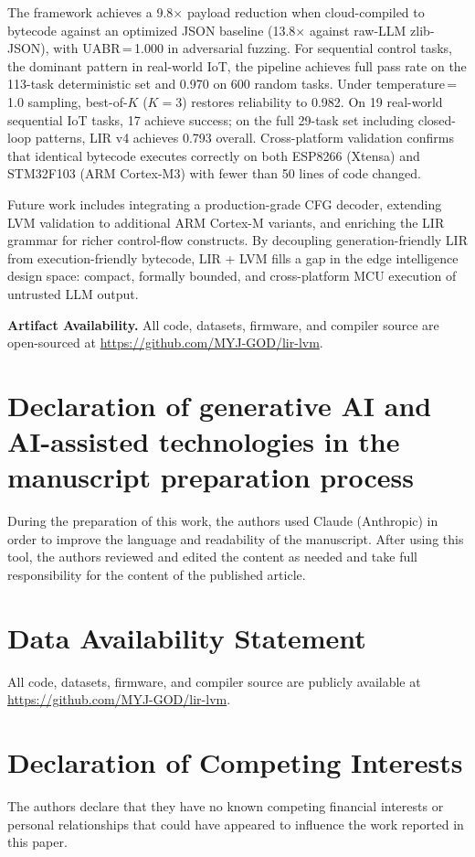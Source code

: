\documentclass[a4paper,fleqn,longmktitle]{cas-dc}
\begin{document}
The framework achieves a 9.8$\times$ payload reduction when cloud-compiled to bytecode against an optimized JSON baseline (13.8$\times$ against raw-LLM zlib-JSON), with UABR\,=\,1.000 in adversarial fuzzing. For sequential control tasks, the dominant pattern in real-world IoT, the pipeline achieves full pass rate on the 113-task deterministic set and 0.970 on 600 random tasks. Under temperature\,=\,1.0 sampling, best-of-$K$ ($K{=}3$) restores reliability to 0.982. On 19 real-world sequential IoT tasks, 17 achieve success; on the full 29-task set including closed-loop patterns, LIR v4 achieves 0.793 overall. Cross-platform validation confirms that identical bytecode executes correctly on both ESP8266 (Xtensa) and STM32F103 (ARM Cortex-M3) with fewer than 50 lines of code changed.

Future work includes integrating a production-grade CFG decoder, extending LVM validation to additional ARM Cortex-M variants, and enriching the LIR grammar for richer control-flow constructs. By decoupling generation-friendly LIR from execution-friendly bytecode, LIR + LVM fills a gap in the edge intelligence design space: compact, formally bounded, and cross-platform MCU execution of untrusted LLM output.

\noindent\textbf{Artifact Availability.} All code, datasets, firmware, and compiler source are open-sourced at \url{https://github.com/MYJ-GOD/lir-lvm}.

\section*{Declaration of generative AI and AI-assisted technologies in the manuscript preparation process}
During the preparation of this work, the authors used Claude (Anthropic) in order to improve the language and readability of the manuscript. After using this tool, the authors reviewed and edited the content as needed and take full responsibility for the content of the published article.

\section*{Data Availability Statement}
All code, datasets, firmware, and compiler source are publicly available at \url{https://github.com/MYJ-GOD/lir-lvm}.

\section*{Declaration of Competing Interests}
The authors declare that they have no known competing financial interests or personal relationships that could have appeared to influence the work reported in this paper.
\end{document}
